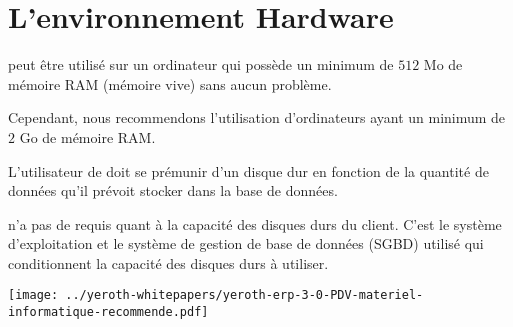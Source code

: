 \chapter{L'environnement Hardware}\label{chap:environement-materiel-requis}



\yeren peut \^etre utilis\'e sur un ordinateur qui
poss\`ede un minimum de $512$ Mo de m\'emoire RAM
(m\'emoire vive) sans aucun probl\`eme.

Cependant, nous recommendons l'utilisation d'ordinateurs
ayant un minimum de $2$ Go de m\'emoire RAM.



L'utilisateur de \yeren doit se pr\'emunir d'un disque
dur en fonction de la quantit\'e de donn\'ees qu'il
pr\'evoit stocker dans la base de donn\'ees.

\yeren n'a pas de requis quant \`a la capacit\'e
des disques durs du client. C'est le syst\`eme d'exploitation
et le syst\`eme de gestion de base de donn\'ees (SGBD)
utilis\'e qui conditionnent la capacit\'e des disques
durs \`a utiliser.


\newpage


\texttt{[image: ../yeroth-whitepapers/yeroth-erp-3-0-PDV-materiel-informatique-recommende.pdf]}
